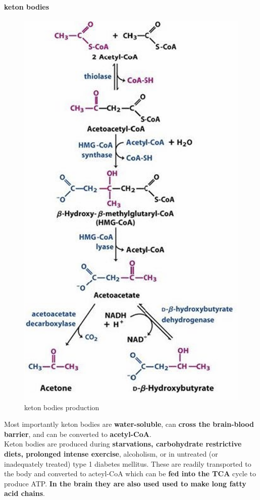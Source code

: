 \documentclass[../main.tex]{subfiles}
\begin{document}
\paragraph{keton bodies}
\begin{figure}[H]
    \centering
    \includegraphics[width=0.3\linewidth]{ketonBodies.png}
    \caption{keton bodies production}
    \label{fig:enter-label}
\end{figure}
Most importantly keton bodies are \textbf{water-soluble}, can \textbf{cross the brain-blood barrier}, and can be converted to \textbf{acetyl-CoA}.\\
\indent Keton bodies are produced during \textbf{starvations, carbohydrate 
restrictive diets, prolonged intense 
exercise}, alcoholism, or in untreated (or 
inadequately treated) type 1 diabetes mellitus. These are readily transported to the body and converted to acteyl-CoA which can be \textbf{fed into the TCA} cycle to produce ATP. \textbf{In the brain they are also used used to make long fatty acid chains}.
\end{document}
